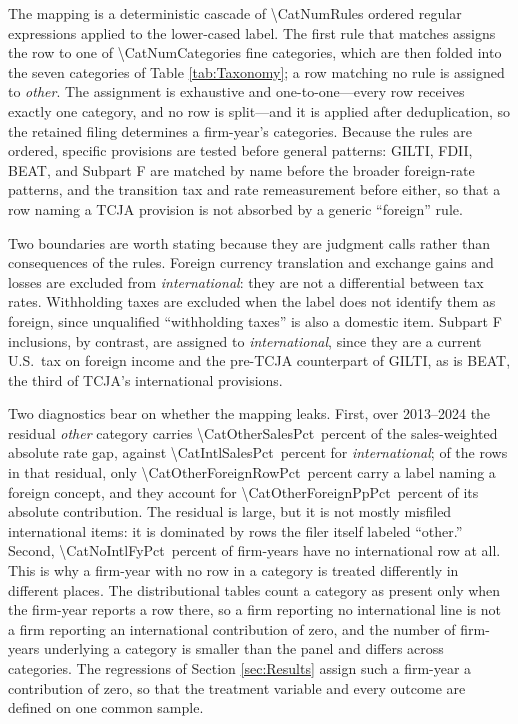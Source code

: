 \documentclass[11pt,letterpaper]{article}
\newcommand{\CountNum}[1]{\num[round-mode=places,round-precision=0]{#1}}
\newcommand{\ShareNum}[1]{\num[round-mode=places,round-precision=1]{#1}}
\begin{document}
The mapping is a deterministic cascade of \CountNum{\CatNumRules}
ordered regular expressions applied to the lower-cased label. The first
rule that matches assigns the row to one of
\CountNum{\CatNumCategories} fine categories, which are then folded
into the seven categories of Table \ref{tab:Taxonomy}; a row matching
no rule is assigned to \emph{other}. The assignment is exhaustive and
one-to-one---every row receives exactly one category, and no row is
split---and it is applied after deduplication, so the retained filing
determines a firm-year's categories. Because the rules are ordered,
specific provisions are tested before general patterns: GILTI, FDII,
BEAT, and Subpart F are matched by name before the broader foreign-rate
patterns, and the transition tax and rate remeasurement before either,
so that a row naming a TCJA provision is not absorbed by a generic
``foreign'' rule.

Two boundaries are worth stating because they are judgment calls rather
than consequences of the rules. Foreign currency translation and
exchange gains and losses are excluded from \emph{international}: they
are not a differential between tax rates. Withholding taxes are
excluded when the label does not identify them as foreign, since
unqualified ``withholding taxes'' is also a domestic item. Subpart F
inclusions, by contrast, are assigned to \emph{international}, since
they are a current U.S.\ tax on foreign income and the pre-TCJA
counterpart of GILTI, as is BEAT, the third of TCJA's international
provisions.

Two diagnostics bear on whether the mapping leaks. First, over
2013--2024 the residual \emph{other} category carries
\ShareNum{\CatOtherSalesPct}\ percent of the sales-weighted absolute
rate gap, against \ShareNum{\CatIntlSalesPct}\ percent for
\emph{international}; of the rows in that residual, only
\ShareNum{\CatOtherForeignRowPct}\ percent carry a label naming a
foreign concept, and they account for
\ShareNum{\CatOtherForeignPpPct}\ percent of its absolute
contribution. The residual is large, but it is not mostly misfiled
international items: it is dominated by rows the filer itself labeled
``other.'' Second, \ShareNum{\CatNoIntlFyPct}\ percent of firm-years
have no international row at all. This is why a firm-year with no row in
a category is treated differently in different places. The
distributional tables count a category as present only when the
firm-year reports a row there, so a firm reporting no international
line is not a firm reporting an international contribution of zero, and
the number of firm-years underlying a category is smaller than the
panel and differs across categories. The regressions of Section
\ref{sec:Results} assign such a firm-year a contribution of zero, so
that the treatment variable and every outcome are defined on one common
sample.
\end{document}
